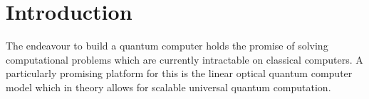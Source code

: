\section{Introduction}
The endeavour to build a quantum computer holds the promise of solving computational problems which are currently intractable on classical computers. A particularly promising platform for this is the linear optical quantum computer model which in theory allows for scalable universal quantum computation. 